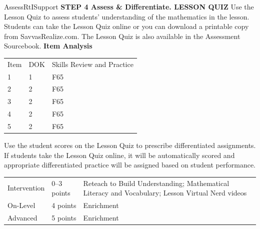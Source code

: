 \documentclass{article}
\newenvironment{te-addendum}[2]{}{}     %
\begin{document}
\begin{te-addendum}{Assess}{RtISupport}
\textbf{STEP 4 Assess \& Differentiate. LESSON QUIZ}
Use the Lesson Quiz to assess students' understanding of the mathematics in the lesson.
Students can take the Lesson Quiz online or you can download a printable copy from SavvasRealize.com. The Lesson Quiz is also available in the Assessment Sourcebook.
\textbf{Item Analysis}
\begin{tabular}{lll}
Item & DOK & Skills Review and Practice \\
1 & 1 & F65 \\
2 & 2 & F65 \\
3 & 2 & F65 \\
4 & 2 & F65 \\
5 & 2 & F65 \\
\end{tabular}
Use the student scores on the Lesson Quiz to prescribe differentiated assignments.
If students take the Lesson Quiz online, it will be automatically scored and appropriate differentiated practice will be assigned based on student performance.
\begin{tabular}{lll}
Intervention & 0--3 points & Reteach to Build Understanding; Mathematical Literacy and Vocabulary; Lesson Virtual Nerd videos \\
On-Level & 4 points & Enrichment \\
Advanced & 5 points & Enrichment \\
\end{tabular}
\end{te-addendum}
\end{document}
